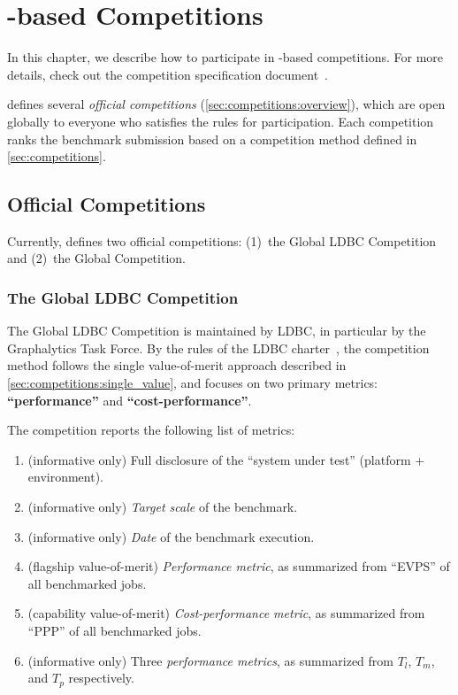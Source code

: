 \chapter{\toolname-based Competitions} \label{chap:competitions}

In this chapter, we describe how to participate in \toolname-based competitions. 
For more details, check out the competition specification document~\cite{CompetitionSpecification}.

\toolname{} defines several {\it official competitions} (\autoref{sec:competitions:overview}), which are open globally to everyone who satisfies the rules for participation. Each competition ranks the benchmark submission based on a competition method defined in \autoref{sec:competitions}.




\section{Official \toolname{} Competitions}
\label{sec:competitions:overview}
Currently, \toolname{} defines two official competitions: (1)~the Global LDBC Competition and (2)~the Global \toolname{} Competition.


\subsection{The Global LDBC Competition} \label{sec:competitions:ldbc}
The Global LDBC Competition is maintained by LDBC, in particular by the Graphalytics Task Force. By the rules of the LDBC charter~\cite{ldbc_byelaws}, the competition method follows the single value-of-merit approach described in \autoref{sec:competitions:single_value}, and focuses on two primary metrics: {\bf ``performance''} and {\bf ``cost-performance''}.

The competition reports the following list of metrics:
\begin{enumerate}
    \item (informative only) Full disclosure of the ``system under test'' (platform + environment).
    \item (informative only) {\it Target scale} of the benchmark.
    \item (informative only) {\it Date} of the benchmark execution.
	\item (flagship value-of-merit) {\it Performance metric}, as summarized from ``EVPS'' of all benchmarked jobs.
	\item (capability value-of-merit) {\it Cost-performance metric}, as summarized from ``PPP'' of all benchmarked jobs.
	\item (informative only) Three {\it performance metrics}, as summarized from $T_l$, $T_m$, and $T_p$ respectively.
\end{enumerate}

